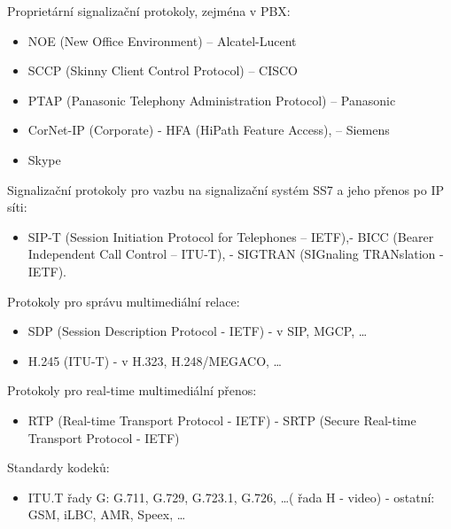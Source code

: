 Proprietární signalizační protokoly, zejména v PBX:
\begin{itemize}[noitemsep]
    \item NOE (New Office Environment) -- Alcatel-Lucent
    \item SCCP (Skinny Client Control Protocol) -- CISCO
    \item PTAP (Panasonic Telephony Administration Protocol) -- Panasonic
    \item CorNet-IP (Corporate) - HFA (HiPath Feature Access), -- Siemens
    \item Skype
\end{itemize}


Signalizační protokoly pro vazbu na signalizační systém SS7 a jeho přenos po IP síti:
\begin{itemize}[noitemsep]
    \item SIP-T (Session Initiation Protocol for Telephones -- IETF),- BICC (Bearer Independent Call Control -- ITU-T), - SIGTRAN (SIGnaling TRANslation - IETF).
\end{itemize}

Protokoly pro správu multimediální relace:
\begin{itemize}[noitemsep]
    \item SDP (Session Description Protocol - IETF) - v SIP, MGCP, \ldots
    \item H.245 (ITU-T) - v H.323, H.248/MEGACO, \ldots
\end{itemize}

Protokoly pro real-time multimediální přenos:
\begin{itemize}[noitemsep]
    \item RTP (Real-time Transport Protocol - IETF) - SRTP (Secure Real-time Transport Protocol - IETF)
\end{itemize}

Standardy kodeků:
\begin{itemize}[noitemsep]
    \item ITU.T řady G: G.711, G.729, G.723.1, G.726, \ldots ( řada H - video) - ostatní: GSM, iLBC, AMR, Speex, \ldots
\end{itemize}


